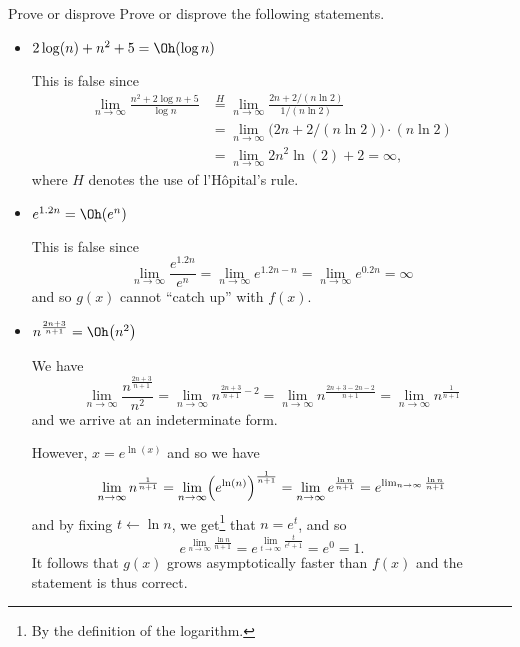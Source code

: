 \documentclass{practice}
\begin{document}
\begin{task}{Prove or disprove}
  Prove or disprove the following statements.
  \begin{itemize}
    \item $2\log(n) + n^2 +5 = \Oh(\log{n})$
    
    This is false since
    \begin{align*}
      \lim_{n\to\infty}\frac{n^2 + 2\log{n} + 5}{\log{n}} &\overset{H}{=}
      \lim_{n\to\infty}\frac{2n + 2/(n\ln2)}{1/(n\ln2)}\\&=
      \lim_{n\to\infty}\bigl(2n + 2/(n\ln2)\bigr)\cdot(n\ln{2})\\&=
      \lim_{n\to\infty}2n^2\ln(2) + 2 = \infty,
    \end{align*}
    where $H$ denotes the use of l'Hôpital's rule.

    \item $e^{1.2n} = \Oh(e^n)$

    This is false since
    \[
      \lim_{n\to\infty}\frac{e^{1.2n}}{e^n}=
      \lim_{n\to\infty}e^{1.2n-n}=
      \lim_{n\to\infty}e^{0.2n}=\infty
    \]
    and so $g(x)$ cannot \enquote{catch up} with $f(x)$.

    \item $n^{\frac{2n + 3}{n+1}} = \Oh\bigl(n^2\bigr)$
    
    We have
    \[
      \lim_{n\to\infty}\frac{n^{\frac{2n + 3}{n+1}}}{n^2}=
      \lim_{n\to\infty}n^{\frac{2n+3}{n+1}-2}=
      \lim_{n\to\infty}n^{\frac{2n+3-2n-2}{n+1}}=
      \lim_{n\to\infty}n^{\frac{1}{n+1}}
    \]
    and we arrive at an indeterminate form.

    However, $x = e^{\ln(x)}$ and so we have
    \[
      \lim_{n\to\infty}n^{\frac{1}{n+1}} =
      \lim_{n\to\infty}\Bigl(e^{\ln(n)}\Bigr)^\frac{1}{n+1} =
      \lim_{n\to\infty}e^\frac{\ln{n}}{n+1}=
      e^{\lim_{n\to\infty}\frac{\ln{n}}{n+1}}
    \]
    and by fixing $t\gets\ln{n}$, we get\footnote{By the definition of the logarithm.} that $n=e^t$, and so
    \[
      e^{\lim_{n\to\infty}\frac{\ln{n}}{n+1}} =
      e^{\lim_{t\to\infty}\frac{t}{e^t+1}} =
      e^0 = 1.
    \]
    It follows that $g(x)$ grows asymptotically faster than $f(x)$ and the statement is thus correct.
  \end{itemize}
\end{task}
\end{document}
